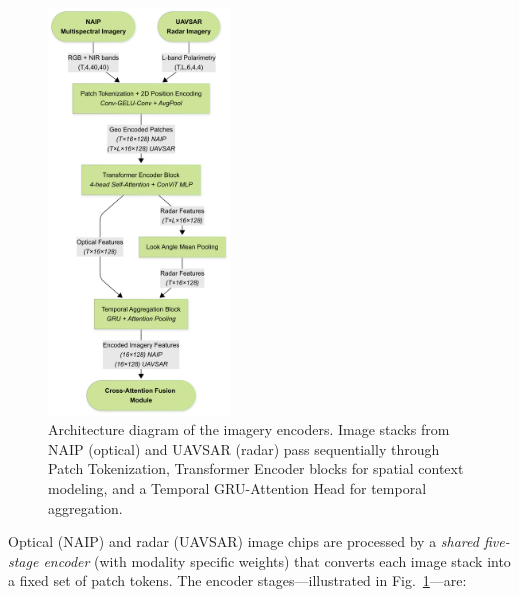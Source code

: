 \documentclass[preprints,article,accept,pdftex,moreauthors]{Definitions/mdpi}
\begin{document}
\begin{figure}
  \vspace{-25pt}  
  \centering
  \includegraphics[trim=0mm 0mm 20mm 0mm, clip, width=0.43\textwidth]{manuscript/figures/Imagery_Encoders.png}
  \caption{Architecture diagram of the imagery encoders. Image stacks from NAIP (optical) and UAVSAR (radar) pass sequentially through Patch Tokenization, Transformer Encoder blocks for spatial context modeling, and a Temporal GRU-Attention Head for temporal aggregation.}
  \label{fig:imgenc}
\end{figure}%

Optical (NAIP) and radar (UAVSAR) image chips are processed by a \emph{shared five-stage encoder} (with modality specific weights) that converts each image stack into a fixed set of patch tokens. The encoder stages—illustrated in Fig.~\ref{fig:imgenc}—are:
\end{document}
